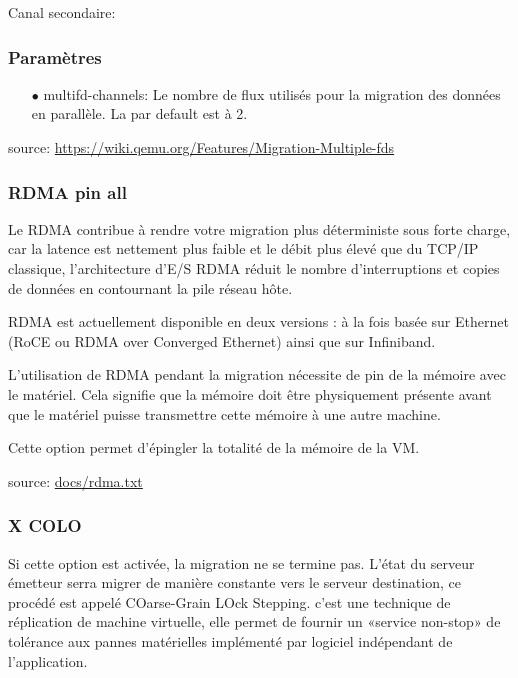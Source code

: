 Canal secondaire:

\subsubsection*{Paramètres}
\begin{itemize}
 \item[$\bullet$]multifd-channels: Le nombre de flux utilisés pour la migration des données en parallèle. La par default est à 2.
\end{itemize}

source:  \url{https://wiki.qemu.org/Features/Migration-Multiple-fds}
\subsubsection*{RDMA pin all}
Le RDMA contribue à rendre votre migration plus déterministe sous forte charge, car la latence est nettement plus faible et le débit plus élevé que du TCP/IP classique, l'architecture d'E/S
RDMA réduit le nombre d'interruptions et copies de données en contournant la pile réseau hôte.

RDMA est actuellement disponible en deux versions : à la fois basée sur Ethernet (RoCE ou RDMA over Converged Ethernet) ainsi que sur Infiniband.

L'utilisation de RDMA pendant la migration nécessite de pin de la mémoire avec le matériel.
Cela signifie que la mémoire doit être physiquement présente avant que le matériel puisse transmettre cette mémoire à une autre machine.

Cette option permet d'épingler la totalité de la mémoire de la VM.



source:  \url{docs/rdma.txt}

\subsubsection*{X COLO}
Si cette option est activée, la migration ne se termine pas.
L'état du serveur émetteur serra migrer de manière constante vers le serveur destination, ce procédé est appelé COarse-Grain LOck Stepping.
c'est une technique de réplication de machine virtuelle, elle permet de fournir un «service non-stop» de tolérance aux pannes matérielles implémenté par logiciel indépendant de l'application.

